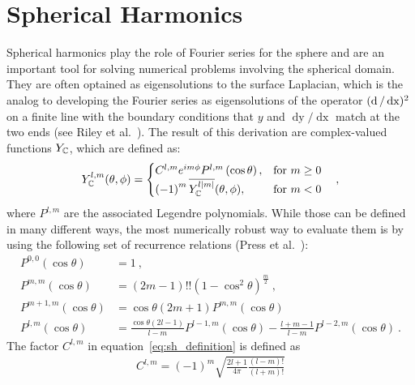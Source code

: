 \section{Spherical Harmonics}
\label{sec:sh}

Spherical harmonics play the role of Fourier series for the sphere and are an important tool for solving numerical problems involving the spherical domain. They are often optained as eigensolutions to the surface Laplacian, which is the analog to developing the Fourier series as eigensolutions of the operator $(\operatorname{d}/\operatorname{dx})^2$ on a finite line with the boundary conditions that $y$ and $\operatorname{dy}/\operatorname{dx}$ match at the two ends (see Riley et al.~\cite{Riley2006}). The result of this derivation are complex-valued functions $Y_{\mathbb{C}}$, which are defined as:
\begin{align}
\label{eq:sh_definition}
Y_{\mathbb{C}}^{l,m}(\theta, \phi)=
\begin{cases}
C^{l,m}e^{im\phi}P^{l,m}\left(\operatorname{cos}\theta\right), & \text{for $m\ge0$}\\
\left(-1\right)^m\overline{Y_{\mathbb{C}}^{l\left|m\right|}}(\theta, \phi), & \text{for $m<0$}
\end{cases}
\quad ,
\end{align}
where $P^{l,m}$ are the associated Legendre polynomials. While those can be defined in many different ways, the most numerically robust way to evaluate them is by using the following set of recurrence relations (Press et al.~\cite{Press07}):
\begin{align}
P^{0,0}\left(\operatorname{cos}\theta\right) &=
1
\  ,
\nonumber
\\
P^{m,m}\left(\operatorname{cos}\theta\right) &=
\left(2m-1\right)!!\left(1-\operatorname{cos}^2\theta\right)^\frac{m}{2}
\  ,
\nonumber
\\
P^{m+1,m}\left(\operatorname{cos}\theta\right) &=
\operatorname{cos}\theta\left(2m+1\right)P^{m,m}\left(\operatorname{cos}\theta\right)
\ 
\nonumber
\\
P^{l,m}\left(\operatorname{cos}\theta\right) &=
\frac{\operatorname{cos}\theta\left(2l-1\right)}{l-m}
P^{l-1,m}\left(\operatorname{cos}\theta\right)
-
\frac{l+m-1}{l-m}
P^{l-2,m}\left(\operatorname{cos}\theta\right)
\  .
\label{eq:sh_Plm}
\end{align}
The factor $C^{l,m}$ in equation~\ref{eq:sh_definition} is defined as
\begin{align}
\label{eq:sh_definition_C}
C^{l,m}=(-1)^m\sqrt{\frac{2l+1}{4\pi}\frac{(l-m)!}{(l+m)!}}
\end{align}
